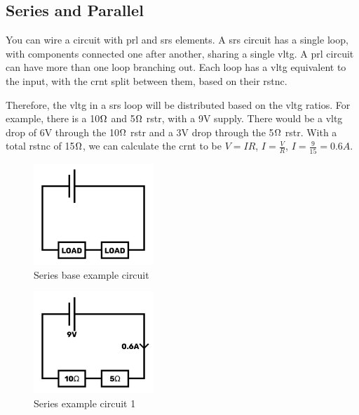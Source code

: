 \documentclass[a4paper,11pt]{report}
\begin{document}
\vspace*{1\baselineskip}

\subsection{Series and Parallel}

You can wire a circuit with \gls{prl} and \gls{srs} elements. A \gls{srs} circuit has a single loop, with components connected one after another, sharing a single \gls{vltg}. A \gls{prl} circuit can have more than one loop branching out. Each loop has a \gls{vltg} equivalent to the input, with the \gls{crnt} split between them, based on their \gls{rstnc}.

Therefore, the \gls{vltg} in a \gls{srs} loop will be distributed based on the \gls{vltg} ratios. For example, there is a 10$\ohm$ and 5$\ohm$ \gls{rstr}, with a 9V supply. There would be a \gls{vltg} drop of 6V through the 10$\ohm$ \gls{rstr} and a 3V drop through the 5$\ohm$ \gls{rstr}. With a total \gls{rstnc} of 15$\ohm$, we can calculate the \gls{crnt} to be $V=IR$, $I=\frac{V}{R}$, $I=\frac{9}{15}=0.6A$.

\begin{figure}[H]
\centering
\includegraphics[width=0.4\textwidth]{series1}
\caption{Series base example circuit}
\end{figure}

\begin{figure}[H]
\centering
\includegraphics[width=0.4\textwidth]{series2}
\caption{Series example circuit 1}
\end{figure}
\end{document}
